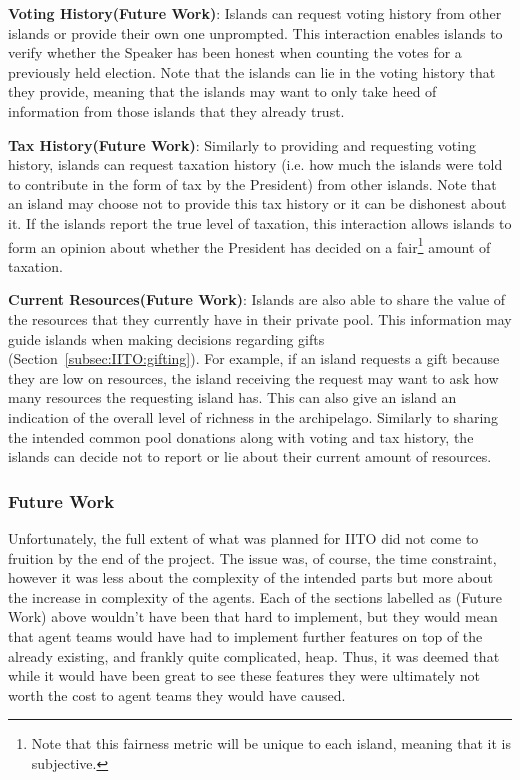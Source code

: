 \textbf{Voting History(Future Work)}: Islands can request voting history from other islands or provide their own one unprompted. This interaction enables islands to verify whether the Speaker has been honest when counting the votes for a previously held election. Note that the islands can lie in the voting history that they provide, meaning that the islands may want to only take heed of information from those islands that they already trust.

\textbf{Tax History(Future Work)}: Similarly to providing and requesting voting history, islands can request taxation history (i.e. how much the islands were told to contribute in the form of tax by the President) from other islands. Note that an island may choose not to provide this tax history or it can be dishonest about it. If the islands report the true level of taxation, this interaction allows islands to form an opinion about whether the President has decided on a fair\footnote{Note that this fairness metric will be unique to each island, meaning that it is subjective.} amount of taxation.

\textbf{Current Resources(Future Work)}: Islands are also able to share the value of the resources that they currently have in their private pool. This information may guide islands when making decisions regarding gifts (Section~\ref{subsec:IITO:gifting}). For example, if an island requests a gift because they are low on resources, the island receiving the request may want to ask how many resources the requesting island has. This can also give an island an indication of the overall level of richness in the archipelago. Similarly to sharing the intended common pool donations along with voting and tax history, the islands can decide not to report or lie about their current amount of resources.

\subsubsection{Future Work}
Unfortunately, the full extent of what was planned for IITO did not come to fruition by the end of the project. The issue was, of course, the time constraint, however it was less about the complexity of the intended parts but more about the increase in complexity of the agents. Each of the sections labelled as (Future Work) above wouldn't have been that hard to implement, but they would mean that agent teams would have had to implement further features on top of the already existing, and frankly quite complicated, heap. Thus, it was deemed that while it would have been great to see these features they were ultimately not worth the cost to agent teams they would have caused. 

